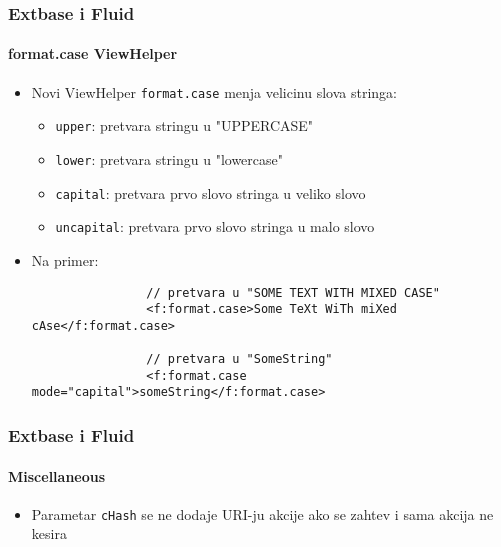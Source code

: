 
\begin{frame}[fragile]
	\frametitle{Extbase i Fluid}
	\framesubtitle{format.case ViewHelper}

	\begin{itemize}

		\item Novi ViewHelper \texttt{format.case} menja velicinu slova stringa:
			\begin{itemize}
				\item \texttt{upper}: pretvara stringu u  "UPPERCASE"
				\item \texttt{lower}: pretvara stringu u  "lowercase"
				\item \texttt{capital}: pretvara prvo slovo stringa u veliko slovo
				\item \texttt{uncapital}: pretvara prvo slovo stringa u malo slovo
			\end{itemize}

		\item Na primer:

			\begin{lstlisting}
				// pretvara u "SOME TEXT WITH MIXED CASE"
				<f:format.case>Some TeXt WiTh miXed cAse</f:format.case>

				// pretvara u "SomeString"
				<f:format.case mode="capital">someString</f:format.case>
			\end{lstlisting}

	\end{itemize}

\end{frame}


\begin{frame}[fragile]
	\frametitle{Extbase i Fluid}
	\framesubtitle{Miscellaneous}

	\begin{itemize}

		\item Parametar \texttt{cHash} se ne dodaje URI-ju akcije ako se zahtev i sama akcija ne kesira

	\end{itemize}

\end{frame}

